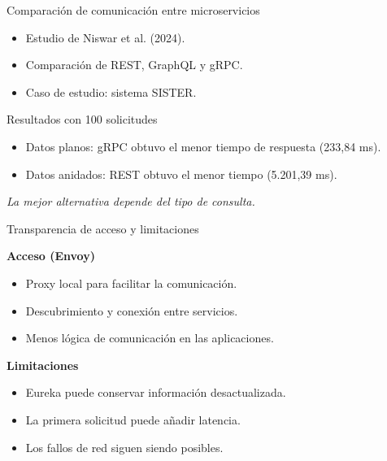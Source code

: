 \begin{frame}{Comparación de comunicación entre microservicios}

    \begin{itemize}
        \item Estudio de Niswar et al. (2024).
        \item Comparación de REST, GraphQL y gRPC.
        \item Caso de estudio: sistema SISTER.
    \end{itemize}

    \vspace{0.3cm}

    \begin{block}{Resultados con 100 solicitudes}
        \begin{itemize}
            \item Datos planos: gRPC obtuvo el menor tiempo
            de respuesta (233,84 ms).
            \item Datos anidados: REST obtuvo el menor
            tiempo (5.201,39 ms).
        \end{itemize}
    \end{block}

    \centering
    \textit{La mejor alternativa depende del tipo de consulta.}

    \parencite{niswar2024grpc}

\end{frame}


\begin{frame}{Transparencia de acceso y limitaciones}

    \textbf{Acceso (Envoy)}

    \begin{itemize}
        \item Proxy local para facilitar la comunicación.
        \item Descubrimiento y conexión entre servicios.
        \item Menos lógica de comunicación en las aplicaciones.
    \end{itemize}

    \vspace{0.2cm}

    \textbf{Limitaciones}

    \begin{itemize}
        \item Eureka puede conservar información desactualizada.
        \item La primera solicitud puede añadir latencia.
        \item Los fallos de red siguen siendo posibles.
    \end{itemize}

    \parencite{vroom2023mesh}
\end{frame}



